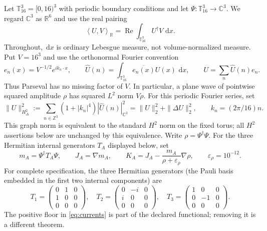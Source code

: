 \documentclass[11pt]{article}
\numberwithin{equation}{section}
\theoremstyle{definition}
\newcommand{\T}{\mathbb T}
\newcommand{\C}{\mathbb C}
\newcommand{\R}{\mathbb R}
\newcommand{\dd}{\,\mathrm d}
\newcommand{\ip}[2]{\left\langle #1,#2\right\rangle}
\newcommand{\eps}{\varepsilon}
\begin{document}
Let $\T^3_{16}=[0,16)^3$ with periodic boundary conditions and let
$\Psi:\T^3_{16}\to\C^3$.  We regard $\C^3$ as $\R^6$ and use the real pairing
\begin{equation}
 \ip{U}{V}_{\R}=\operatorname{Re}\int_{\T^3_{16}}U^\dagger V\,\dd x.
 \label{eq:real-pairing}
\end{equation}
Throughout, $\dd x$ is ordinary Lebesgue measure, not volume-normalized
measure.  Put $V=16^3$ and use the orthonormal Fourier convention
\begin{equation}
 e_n(x)=V^{-1/2}e^{ik_n\cdot x},\qquad
 \widehat U(n)=\int_{\T^3_{16}}\overline{e_n(x)}U(x)\,\dd x,
 \qquad U=\sum_n\widehat U(n)e_n.
 \label{eq:fourier-normalization}
\end{equation}
Thus Parseval has no missing factor of $V$.  In particular, a plane wave
of pointwise squared amplitude $\rho$ has squared $L^2$ norm $V\rho$.
For this periodic Fourier series, set
\begin{equation}
 \|U\|_{H^2_\Delta}^2:=
 \sum_{n\in\mathbb Z^3}(1+|k_n|^4)|\widehat U(n)|_{\mathbb C^3}^2
 =\|U\|_2^2+\|\Delta U\|_2^2,\qquad k_n=(2\pi/16)n.
 \label{eq:graph-norm}
\end{equation}
This graph norm is equivalent to the standard $H^2$ norm on the fixed torus;
all $H^2$ assertions below are unchanged by this equivalence.  Write
$\rho=\Psi^\dagger\Psi$.  For the three Hermitian internal generators
$T_A$ displayed below, set
\begin{equation}
 m_A=\Psi^\dagger T_A\Psi,\qquad
 J_A=\nabla m_A,\qquad
 K_A=J_A-\frac{m_A}{\rho+\eps_\rho}\nabla\rho,
 \qquad \eps_\rho=10^{-12}.
 \label{eq:currents}
\end{equation}
For complete specification, the three Hermitian generators (the Pauli basis
embedded in the first two internal components) are
\begin{equation}
 T_1=\begin{pmatrix}0&1&0\\1&0&0\\0&0&0\end{pmatrix},\quad
 T_2=\begin{pmatrix}0&-i&0\\ i&0&0\\0&0&0\end{pmatrix},\quad
 T_3=\begin{pmatrix}1&0&0\\0&-1&0\\0&0&0\end{pmatrix}.
 \label{eq:generators}
\end{equation}
The positive floor in \eqref{eq:currents} is part of the declared functional;
removing it is a different theorem.
\end{document}
